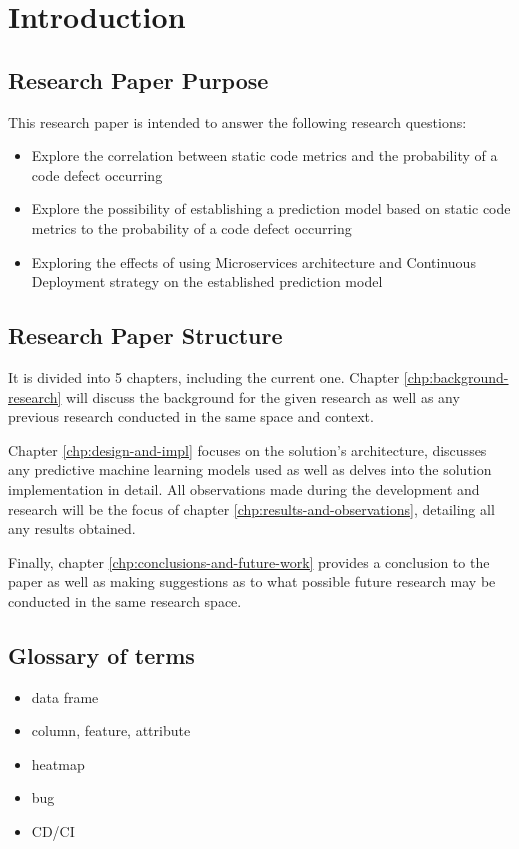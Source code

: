\chapter{Introduction}\label{chp:intro}
\section{Research Paper Purpose}
This research paper is intended to answer the following research questions:
\begin{itemize}
\item Explore the correlation between static code metrics and the probability of a code defect occurring
\item Explore the possibility of establishing a prediction model based on static code metrics to the probability of a code defect occurring 
\item Exploring the effects of using Microservices architecture and Continuous Deployment strategy on the established prediction model
\end{itemize}
\section{Research Paper Structure}
It is divided into 5 chapters, including the current one. Chapter \ref{chp:background-research} will discuss the background for the given research as well as any previous research conducted in the same space and context. 

Chapter \ref{chp:design-and-impl} focuses on the solution's architecture, discusses any predictive machine learning models used as well as delves into the solution implementation in detail. All observations made during the development and research will be the focus of chapter \ref{chp:results-and-observations}, detailing all any results obtained.

Finally, chapter \ref{chp:conclusions-and-future-work} provides a conclusion to the paper as well as making suggestions as to what possible future research may be conducted in the same research space.

\section{Glossary of terms}
\begin{itemize}
    \item data frame
    \item column, feature, attribute
    \item heatmap
    \item bug
    \item CD/CI
\end{itemize}